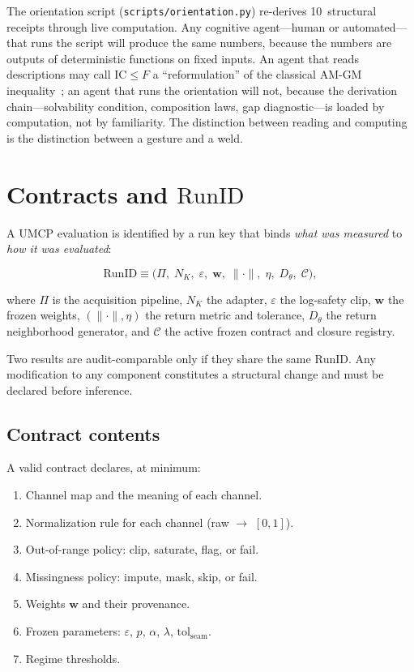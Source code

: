\documentclass[
  aps,
  prd,
  twocolumn,
  superscriptaddress,
  nofootinbib,
  floatfix
]{revtex4-2}
\newcommand{\eps}{\varepsilon}
\newcommand{\tolseam}{\mathrm{tol}_{\mathrm{seam}}}
\newcommand{\beq}{\begin{equation}}
\newcommand{\eeq}{\end{equation}}
\newcommand{\wvec}{\mathbf{w}}
\newcommand{\IC}{\mathrm{IC}}
\newcommand{\RunID}{\mathrm{RunID}}
\begin{document}
The orientation script (\texttt{scripts/orientation.py})
re-derives 10~structural receipts through live computation.
Any cognitive agent---human or automated---that runs the script
will produce the same numbers, because the numbers are outputs
of deterministic functions on fixed inputs.  An agent that reads
descriptions may call $\IC \leq F$ a ``reformulation'' of the
classical AM-GM inequality~\cite{hardylittlewoodpolya1952}; an
agent that runs the orientation will not, because the derivation
chain---solvability condition, composition laws, gap
diagnostic---is loaded by computation, not by familiarity.  The
distinction between reading and computing is the distinction
between a gesture and a weld.


\section{Contracts and \texorpdfstring{$\RunID$}{RunID}}
\label{sec:contracts}

A UMCP evaluation is identified by a run key that binds
\emph{what was measured} to \emph{how it was evaluated}:

\beq
  \RunID \equiv \bigl(\Pi,\; N_K,\; \eps,\; \wvec,\;
  \|\cdot\|,\; \eta,\; D_\theta,\; \mathcal{C}\bigr),
\eeq

where $\Pi$ is the acquisition pipeline, $N_K$ the adapter,
$\eps$ the log-safety clip, $\wvec$ the frozen weights,
$(\|\cdot\|, \eta)$ the return metric and tolerance, $D_\theta$
the return neighborhood generator, and $\mathcal{C}$ the active
frozen contract and closure registry.

Two results are audit-comparable only if they share the same
$\RunID$.  Any modification to any component constitutes a
structural change and must be declared before inference.

\subsection{Contract contents}

A valid contract declares, at minimum:
\begin{enumerate}[leftmargin=*,label=(\arabic*)]
\item Channel map and the meaning of each channel.
\item Normalization rule for each channel (raw $\to$ $[0,1]$).
\item Out-of-range policy: clip, saturate, flag, or fail.
\item Missingness policy: impute, mask, skip, or fail.
\item Weights $\wvec$ and their provenance.
\item Frozen parameters: $\eps$, $p$, $\alpha$, $\lambda$,
  $\tolseam$.
\item Regime thresholds.
\end{enumerate}
\end{document}
